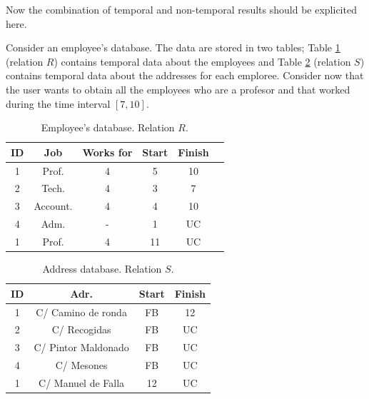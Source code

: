\documentclass{llncs}
\begin{document}
Now the combination of temporal and non-temporal results should be explicited here.
\begin{example}
Consider an employee's database. The data are stored in two tables; Table \ref{table:employees} (relation $R$) contains temporal data about the employees and Table \ref{table:address} (relation $S$) contains temporal  data about the addresses for each emploree. Consider now that the user wants to obtain all the employees who are a profesor and that worked during the time interval $\left[7, 10 \right]$.

\begin{table}
\centering
\caption{Employee's database. Relation $R$.}

\begin{tabular}{c c c c c c }
\hline
ID & Job & Works for & Start & Finish \\ \hline
1 & Prof. & 4 & 5 & 10 \\
2 & Tech. & 4 & 3 & 7 \\
3 & Account. & 4  & 4 & 10 \\
4 & Adm. & - & 1 & UC \\
1 & Prof. & 4 & 11 & UC \\
\hline 
\end{tabular}
\label{table:employees}



\end{table}



\begin{table}
\centering
\caption{Address database. Relation $S$.}

\begin{tabular}{c c c c }
\hline
ID & Adr. & Start & Finish \\ \hline
1 & C/ Camino de ronda & FB & 12 \\
2 & C/ Recogidas & FB & UC \\ 
3 & C/ Pintor Maldonado & FB & UC \\
4 & C/ Mesones & FB & UC \\
1 & C/ Manuel de Falla & 12 & UC \\
\hline 
\end{tabular}
\label{table:address}


\end{table}
\end{example}
\end{document}
